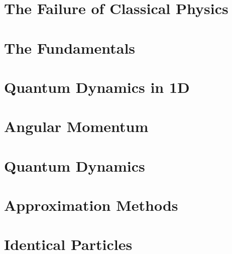 \documentclass{book}
\begin{document}


\tableofcontents
\chapter{The Failure of Classical Physics}
	
\chapter{The Fundamentals}
	
\chapter{Quantum Dynamics in 1D}
	
\chapter{Angular Momentum}
	
\chapter{Quantum Dynamics}
	
\chapter{Approximation Methods}
	
\chapter{Identical Particles}
	
\end{document}
